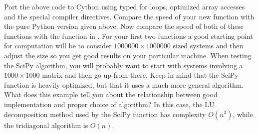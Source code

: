\begin{problem}
Port the above code to Cython using typed for loops, optimized array accesses and the special compiler directives.
Compare the speed of your new function with the pure Python version given above.
Now compare the speed of both of these functions with the  function in .
For your first two functions a good starting point for computation will be to consider $1000000 \times 1000000$ sized systems and then adjust the size so you get good results on your particular machine.
When testing the SciPy algorithm, you will probably want to start with systems involving a $1000 \times 1000$ matrix and then go up from there.
Keep in mind that the SciPy function is heavily optimized, but that it uses a much more general algorithm.
What does this example tell you about the relationship between good implementation and proper choice of algorithm?
In this case, the LU decomposition method used by the SciPy function has complexity $O(n^3)$, while the tridiagonal algorithm is $O(n)$.
\end{problem}
